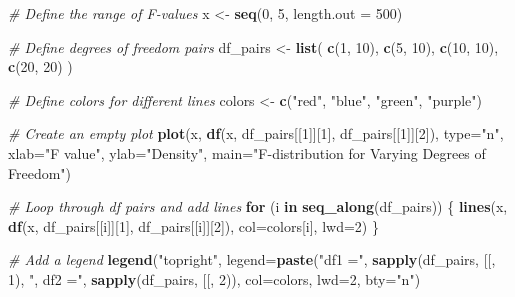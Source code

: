 \documentclass[
  letterpaper,
]{book}
\newenvironment{Shaded}{\begin{snugshade}}{\end{snugshade}}
\newcommand{\AttributeTok}[1]{\textcolor[rgb]{0.13,0.29,0.53}{#1}}
\newcommand{\CommentTok}[1]{\textcolor[rgb]{0.56,0.35,0.01}{\textit{#1}}}
\newcommand{\ControlFlowTok}[1]{\textcolor[rgb]{0.13,0.29,0.53}{\textbf{#1}}}
\newcommand{\DecValTok}[1]{\textcolor[rgb]{0.00,0.00,0.81}{#1}}
\newcommand{\FunctionTok}[1]{\textcolor[rgb]{0.13,0.29,0.53}{\textbf{#1}}}
\newcommand{\NormalTok}[1]{#1}
\newcommand{\OtherTok}[1]{\textcolor[rgb]{0.56,0.35,0.01}{#1}}
\newcommand{\StringTok}[1]{\textcolor[rgb]{0.31,0.60,0.02}{#1}}
\begin{document}
\begin{Shaded}
\begin{Highlighting}[]
\CommentTok{\# Define the range of F{-}values}
\NormalTok{x }\OtherTok{\textless{}{-}} \FunctionTok{seq}\NormalTok{(}\DecValTok{0}\NormalTok{, }\DecValTok{5}\NormalTok{, }\AttributeTok{length.out =} \DecValTok{500}\NormalTok{)}

\CommentTok{\# Define degrees of freedom pairs}
\NormalTok{df\_pairs }\OtherTok{\textless{}{-}} \FunctionTok{list}\NormalTok{(}
  \FunctionTok{c}\NormalTok{(}\DecValTok{1}\NormalTok{, }\DecValTok{10}\NormalTok{),}
  \FunctionTok{c}\NormalTok{(}\DecValTok{5}\NormalTok{, }\DecValTok{10}\NormalTok{),}
  \FunctionTok{c}\NormalTok{(}\DecValTok{10}\NormalTok{, }\DecValTok{10}\NormalTok{),}
  \FunctionTok{c}\NormalTok{(}\DecValTok{20}\NormalTok{, }\DecValTok{20}\NormalTok{)}
\NormalTok{)}

\CommentTok{\# Define colors for different lines}
\NormalTok{colors }\OtherTok{\textless{}{-}} \FunctionTok{c}\NormalTok{(}\StringTok{"red"}\NormalTok{, }\StringTok{"blue"}\NormalTok{, }\StringTok{"green"}\NormalTok{, }\StringTok{"purple"}\NormalTok{)}

\CommentTok{\# Create an empty plot}
\FunctionTok{plot}\NormalTok{(x, }\FunctionTok{df}\NormalTok{(x, df\_pairs[[}\DecValTok{1}\NormalTok{]][}\DecValTok{1}\NormalTok{], df\_pairs[[}\DecValTok{1}\NormalTok{]][}\DecValTok{2}\NormalTok{]), }\AttributeTok{type=}\StringTok{"n"}\NormalTok{,}
     \AttributeTok{xlab=}\StringTok{"F value"}\NormalTok{, }\AttributeTok{ylab=}\StringTok{"Density"}\NormalTok{,}
     \AttributeTok{main=}\StringTok{"F{-}distribution for Varying Degrees of Freedom"}\NormalTok{)}

\CommentTok{\# Loop through df pairs and add lines}
\ControlFlowTok{for}\NormalTok{ (i }\ControlFlowTok{in} \FunctionTok{seq\_along}\NormalTok{(df\_pairs)) \{}
  \FunctionTok{lines}\NormalTok{(x, }\FunctionTok{df}\NormalTok{(x, df\_pairs[[i]][}\DecValTok{1}\NormalTok{], df\_pairs[[i]][}\DecValTok{2}\NormalTok{]), }\AttributeTok{col=}\NormalTok{colors[i], }\AttributeTok{lwd=}\DecValTok{2}\NormalTok{)}
\NormalTok{\}}

\CommentTok{\# Add a legend}
\FunctionTok{legend}\NormalTok{(}\StringTok{"topright"}\NormalTok{, }\AttributeTok{legend=}\FunctionTok{paste}\NormalTok{(}\StringTok{"df1 ="}\NormalTok{, }\FunctionTok{sapply}\NormalTok{(df\_pairs, }\StringTok{\textasciigrave{}}\AttributeTok{[[}\StringTok{\textasciigrave{}}\NormalTok{, }\DecValTok{1}\NormalTok{), }\StringTok{", df2 ="}\NormalTok{, }\FunctionTok{sapply}\NormalTok{(df\_pairs, }\StringTok{\textasciigrave{}}\AttributeTok{[[}\StringTok{\textasciigrave{}}\NormalTok{, }\DecValTok{2}\NormalTok{)), }
       \AttributeTok{col=}\NormalTok{colors, }\AttributeTok{lwd=}\DecValTok{2}\NormalTok{, }\AttributeTok{bty=}\StringTok{"n"}\NormalTok{)}
\end{Highlighting}
\end{Shaded}
\end{document}

